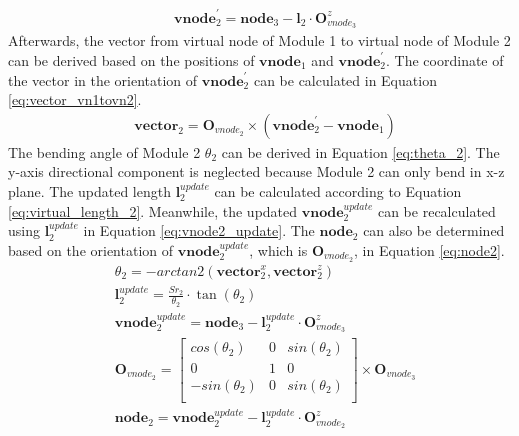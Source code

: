 \begin{itemize}
    \begin{align}
        &\textbf{vnode}_{2}^{'} = \textbf{node}_{3} - \textbf{l}_{2} \cdot \textbf{O}_{vnode_3}^{z}
        \label{eq:vnode2_origin}
    \end{align}
    Afterwards, the vector from virtual node of Module 1 to virtual node of Module 2 can be derived based on the 
    positions of $\textbf{vnode}_{1}$ and $\textbf{vnode}_{2}^{'}$. The coordinate of the vector in the orientation 
    of $\textbf{vnode}_{2}^{'}$ can be calculated in Equation \ref{eq:vector_vn1tovn2}. 
    \begin{align}
        &\textbf{vector}_{2} = \textbf{O}_{vnode_2} \times (\textbf{vnode}_{2}^{'} - \textbf{vnode}_{1}) 
        \label{eq:vector_vn1tovn2} 
    \end{align}
    The bending angle of Module 2 $\theta_2$ can be derived in Equation \ref{eq:theta_2}. The y-axis directional 
    component is neglected because Module 2 can only bend in x-z plane. The updated length $\textbf{l}_{2}^{update}$ 
    can be calculated according to Equation \ref{eq:virtual_length_2}. Meanwhile, the updated 
    $\textbf{vnode}_{2}^{update}$ can be recalculated using $\textbf{l}_{2}^{update}$ in Equation \ref{eq:vnode2_update}. 
    The $\textbf{node}_2$ can also be determined based on the orientation of $\textbf{vnode}_{2}^{update}$, 
    which is $\textbf{O}_{vnode_2}$, in Equation \ref{eq:node2}.
    \begin{align}
        &\theta_2 = -arctan2(\textbf{vector}_{2}^{x},\textbf{vector}_{2}^{z})
        \label{eq:theta_2} \\
        &\textbf{l}_{2}^{update} = \frac{Sr_2}{\theta_2}\cdot \tan(\theta_2)
        \label{eq:virtual_length_2} \\
        &\textbf{vnode}_{2}^{update} = \textbf{node}_{3} - \textbf{l}_{2}^{update} \cdot \textbf{O}_{vnode_3}^{z}
        \label{eq:vnode2_update} \\
        &\textbf{O}_{vnode_2} =     
        \begin{bmatrix}
            cos(\theta_2) & 0 & sin(\theta_2) \\
            0 & 1 & 0 \\
            -sin(\theta_2) & 0 & sin(\theta_2) \\
        \end{bmatrix}  
        \times \textbf{O}_{vnode_3}
        \label{eq:orientation_vnode2} \\
        &\textbf{node}_2 = \textbf{vnode}_{2}^{update} - \textbf{l}_{2}^{update} \cdot \textbf{O}_{vnode_2}^{z}

\end{align}
\end{itemize}
